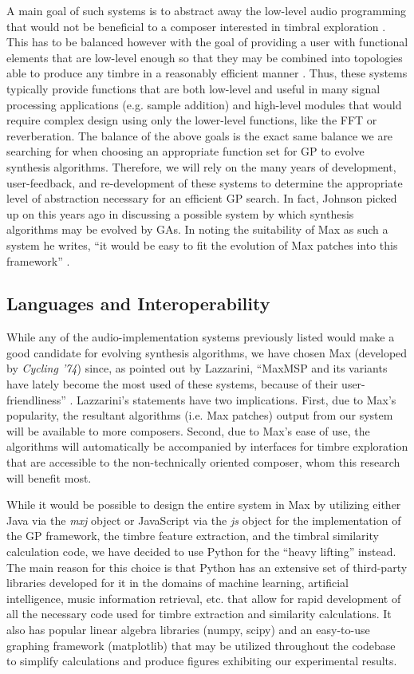 \documentclass[12pt]{report} 	%
\numberwithin{figure}{chapter}
\numberwithin{table}{chapter}
\numberwithin{equation}{chapter}
\begin{document}
\begin{flushleft}
A main goal of such systems is to abstract away the low-level audio programming that would not be beneficial to a composer interested in timbral exploration \cite[p. 1]{Moreno:2005bs}. This has to be balanced however with the goal of providing a user with functional elements that are low-level enough so that they may be combined into topologies able to produce any timbre in a reasonably efficient manner \cite[p. 1]{Moreno:2005bs}. Thus, these systems typically provide functions that are both low-level and useful in many signal processing applications (e.g. sample addition) and high-level modules that would require complex design using only the lower-level functions, like the FFT or reverberation. The balance of the above goals is the exact same balance we are searching for when choosing an appropriate function set for GP to evolve synthesis algorithms. Therefore, we will rely on the many years of development, user-feedback, and re-development of these systems to determine the appropriate level of abstraction necessary for an efficient GP search. In fact, Johnson picked up on this years ago in discussing a possible system by which synthesis algorithms may be evolved by GAs. In noting the suitability of Max as such a system he writes, ``it would be easy to fit the evolution of Max patches into this framework'' \cite[p. 6]{Johnson:1998sh}.

\subsection{Languages and Interoperability}
While any of the audio-implementation systems previously listed would make a good candidate for evolving synthesis algorithms, we have chosen Max (developed by \textit{Cycling '74}) since, as pointed out by Lazzarini, ``MaxMSP and its variants have lately become the most used of these systems, because of their user-friendliness'' \cite[p. 356]{Lazzarini:2004qf}. Lazzarini's statements have two implications. First, due to Max's popularity, the resultant algorithms (i.e. Max patches) output from our system will be available to more composers. Second, due to Max's ease of use, the algorithms will automatically be accompanied by interfaces for timbre exploration that are accessible to the non-technically oriented composer, whom this research will benefit most.

While it would be possible to design the entire system in Max by utilizing either Java via the \textit{mxj} object or JavaScript via the \textit{js} object for the implementation of the GP framework, the timbre feature extraction, and the timbral similarity calculation code, we have decided to use Python for the ``heavy lifting'' instead. The main reason for this choice is that Python has an extensive set of third-party libraries developed for it in the domains of machine learning, artificial intelligence, music information retrieval, etc. that allow for rapid development of all the necessary code used for timbre extraction and similarity calculations. It also has popular linear algebra libraries (numpy, scipy) and an easy-to-use graphing framework (matplotlib) that may be utilized throughout the codebase to simplify calculations and produce figures exhibiting our experimental results.


\end{flushleft}
\end{document}

